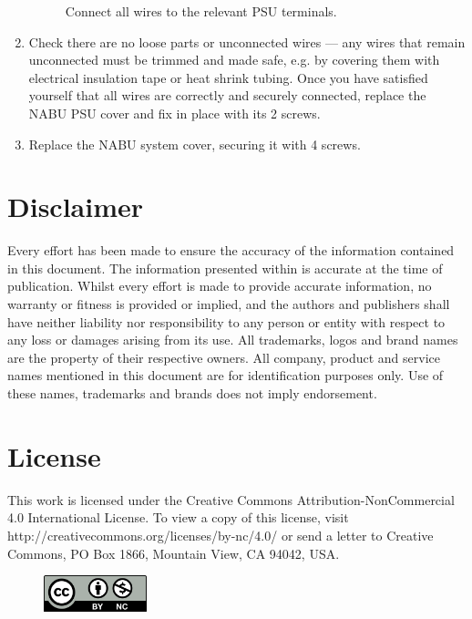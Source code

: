 \documentclass[twocolumn]{article}
\begin{document}
\begin{enumerate}
\begin{figure}[h!]
	    		\caption{Connect all wires to the relevant PSU terminals.}
	    		\label{fig:terminals}
	    	\end{figure}
    		\item Check there are no loose parts or unconnected wires --- any wires that remain unconnected must be trimmed and made safe, e.g. by covering them with electrical insulation tape or heat shrink tubing. Once you have satisfied yourself that all wires are correctly and securely connected, replace the NABU PSU cover and fix in place with its 2 screws.
    		\item Replace the NABU system cover, securing it with 4 screws.
	    \end{enumerate}
    \section*{Disclaimer}
    Every effort has been made to ensure the accuracy of the information contained in this document. The information presented within is accurate at the time of publication.  Whilst every effort is made to provide accurate information, no warranty or fitness is provided or implied, and the authors and publishers shall have neither liability nor responsibility to any person or entity with respect to any loss or damages arising from its use.
    All trademarks, logos and brand names are the property of their respective owners. All company, product and service names mentioned in this document are for identification purposes only. Use of these names, trademarks and brands does not imply endorsement.
    \section*{License}
    This work is licensed under the Creative Commons Attribution-NonCommercial 4.0 International License. To view a copy of this license, visit http://creativecommons.org/licenses/by-nc/4.0/ or send a letter to Creative Commons, PO Box 1866, Mountain View, CA 94042, USA.
   	\begin{figure}[h!]
    	\includegraphics[width=3cm]{images/by-nc.png}
    \end{figure}
\end{document}
